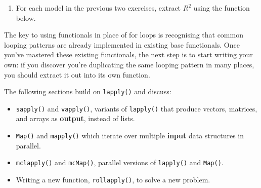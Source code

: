 \begin{enumerate}
\begin{Shaded}
\begin{Highlighting}[]
\StringTok{ }\NormalTok{(}\NormalTok{:}
  \StringTok{ }\NormalTok{(}\NormalTok{:} \NormalTok{)}
\NormalTok{\})}
\end{Highlighting}
\end{Shaded}
\item
  For each model in the previous two exercises, extract $R^2$ using the
  function below.

\begin{Shaded}
\begin{Highlighting}[]
\StringTok{ }
\end{Highlighting}
\end{Shaded}
\end{enumerate}


The key to using functionals in place of for loops is recognising that
common looping patterns are already implemented in existing base
functionals. Once you've mastered these existing functionals, the next
step is to start writing your own: if you discover you're duplicating
the same looping pattern in many places, you should extract it out into
its own function.

The following sections build on \texttt{lapply()} and discuss:

\begin{itemize}
\item
  \texttt{sapply()} and \texttt{vapply()}, variants of \texttt{lapply()}
  that produce vectors, matrices, and arrays as \textbf{output}, instead
  of lists.
\item
  \texttt{Map()} and \texttt{mapply()} which iterate over multiple
  \textbf{input} data structures in parallel.
\item
  \texttt{mclapply()} and \texttt{mcMap()}, parallel versions of
  \texttt{lapply()} and \texttt{Map()}.
\item
  Writing a new function, \texttt{rollapply()}, to solve a new problem.
\end{itemize}

